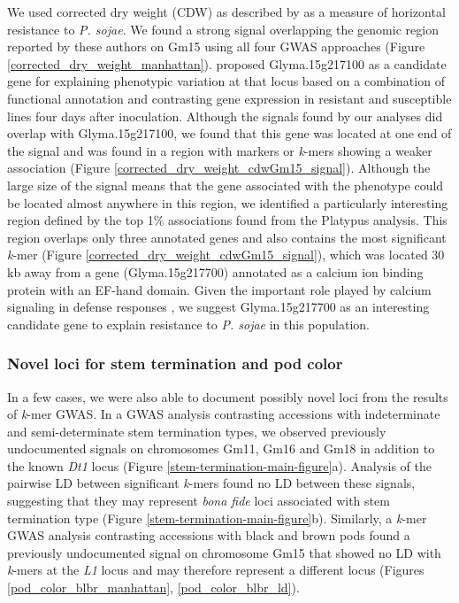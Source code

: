 We used corrected dry weight (CDW) as described by \cite{deronne2022} as a
measure of horizontal resistance to \emph{P. sojae}. We found a strong signal
overlapping the genomic region reported by these authors on Gm15 using all four GWAS
approaches (Figure \ref{corrected_dry_weight_manhattan}). \cite{deronne2022}
proposed Glyma.15g217100 as a candidate gene for explaining phenotypic
variation at that locus based on a combination of functional annotation and
contrasting gene expression in resistant and susceptible lines four days after
inoculation. Although the signals found by our analyses did overlap with
Glyma.15g217100, we found that this gene was located at one end of the signal
and was found in a region with markers or \emph{k}-mers showing a weaker
association (Figure \ref{corrected_dry_weight_cdwGm15_signal}).  Although the
large size of the signal means that the gene associated with the phenotype could
be located almost anywhere in this region, we identified a particularly
interesting region defined by the top 1\% associations found from the Platypus
analysis. This region overlaps only three annotated genes and also contains the
most significant \emph{k}-mer (Figure
\ref{corrected_dry_weight_cdwGm15_signal}), which was located 30 kb away from a
gene (Glyma.15g217700) annotated as a calcium ion binding protein with an
EF-hand domain. Given the important role played by calcium signaling in defense
responses \citep{zhang2014}, we suggest Glyma.15g217700 as an interesting
candidate gene to explain resistance to \emph{P. sojae} in this population.

\subsubsection*{Novel loci for stem termination and pod color}
\label{sv-gwas-main-results-novel-loci}

In a few cases, we were also able to document possibly novel loci from the
results of \textit{k}-mer GWAS. In a GWAS analysis contrasting accessions
with indeterminate and semi-determinate stem termination types, we observed
previously undocumented signals on chromosomes Gm11, Gm16 and Gm18 in
addition to the known \textit{Dt1} locus (Figure \ref{stem-termination-main-figure}a).
Analysis of the pairwise LD between significant \textit{k}-mers found no
LD between these signals, suggesting that they may represent \textit{bona fide}
loci associated with stem termination type
(Figure \ref{stem-termination-main-figure}b). Similarly, a \textit{k}-mer GWAS
analysis contrasting accessions with black and brown pods found a previously
undocumented signal on chromosome Gm15 that showed no LD with \textit{k}-mers
at the \textit{L1} locus and may therefore represent a different locus (Figures
\ref{pod_color_blbr_manhattan}, \ref{pod_color_blbr_ld}).

